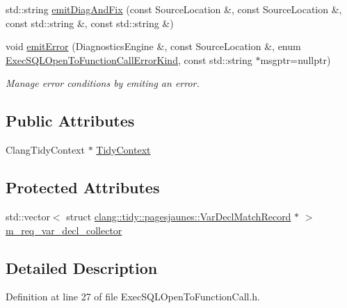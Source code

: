 \begin{DoxyCompactItemize}
std\+::string \hyperlink{classclang_1_1tidy_1_1pagesjaunes_1_1_exec_s_q_l_open_to_function_call_a00b269de2e10d828f3f588911dfc749c}{emit\+Diag\+And\+Fix} (const Source\+Location \&, const Source\+Location \&, const std\+::string \&, const std\+::string \&)
\item 
void \hyperlink{classclang_1_1tidy_1_1pagesjaunes_1_1_exec_s_q_l_open_to_function_call_a8bf527ab87666c879c7fcb9410a52878}{emit\+Error} (Diagnostics\+Engine \&, const Source\+Location \&, enum \hyperlink{classclang_1_1tidy_1_1pagesjaunes_1_1_exec_s_q_l_open_to_function_call_abed8dbc3acbddecbc56bee7b5b5a75fc}{Exec\+S\+Q\+L\+Open\+To\+Function\+Call\+Error\+Kind}, const std\+::string $\ast$msgptr=nullptr)
\begin{DoxyCompactList}\small\item\em Manage error conditions by emiting an error. \end{DoxyCompactList}\end{DoxyCompactItemize}
\subsection*{Public Attributes}
\begin{DoxyCompactItemize}
\item 
Clang\+Tidy\+Context $\ast$ \hyperlink{classclang_1_1tidy_1_1pagesjaunes_1_1_exec_s_q_l_open_to_function_call_a304eb2e17cc9ae4e3cbd173a0d34fb74}{Tidy\+Context}
\end{DoxyCompactItemize}
\subsection*{Protected Attributes}
\begin{DoxyCompactItemize}
\item 
std\+::vector$<$ struct \hyperlink{structclang_1_1tidy_1_1pagesjaunes_1_1_var_decl_match_record}{clang\+::tidy\+::pagesjaunes\+::\+Var\+Decl\+Match\+Record} $\ast$ $>$ \hyperlink{classclang_1_1tidy_1_1pagesjaunes_1_1_exec_s_q_l_open_to_function_call_a6113aee6328fb5829b679587def404c5}{m\+\_\+req\+\_\+var\+\_\+decl\+\_\+collector}
\end{DoxyCompactItemize}


\subsection{Detailed Description}


Definition at line 27 of file Exec\+S\+Q\+L\+Open\+To\+Function\+Call.\+h.



